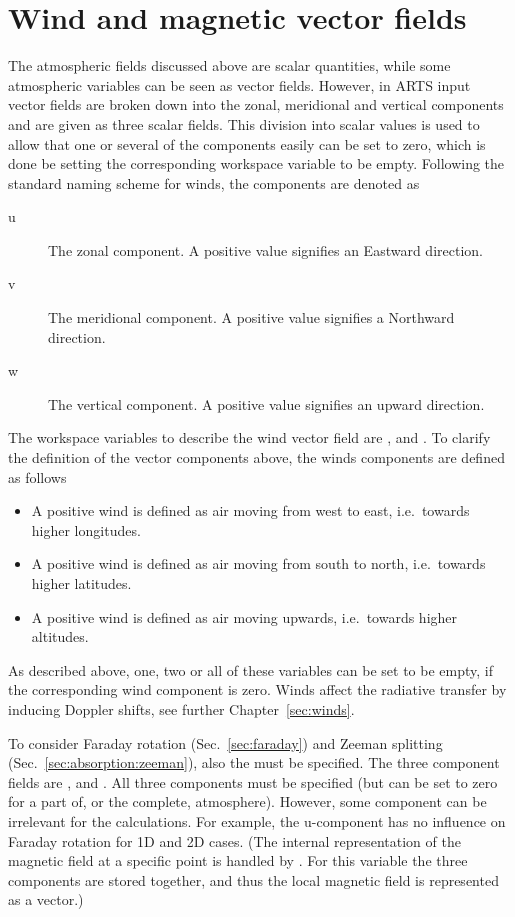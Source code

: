 \section{Wind and magnetic vector fields}
\label{sec:atm:vecfields}
%
The atmospheric fields discussed above are scalar quantities, while some
atmospheric variables can be seen as vector fields. However, in ARTS input
vector fields are broken down into the zonal, meridional and vertical
components and are given as three scalar fields. This division into scalar
values is used to allow that one or several of the components easily can be set
to zero, which is done be setting the corresponding workspace variable to be
empty. Following the standard naming scheme for winds, the components are
denoted as
\begin{description}
\item[u] The zonal component. A positive value signifies an Eastward direction.
\item[v] The meridional component. A positive value signifies a Northward
  direction.
\item[w] The vertical component. A positive value signifies an upward
  direction.
\end{description}
The workspace variables to describe the wind vector field are
,  and
. To clarify the definition of the vector components
above, the winds components are defined as follows
\begin{itemize}
\item[\WindWE] A positive wind is defined as air moving
  from west to east, i.e.\ towards higher longitudes.
\item[\WindSN] A positive wind is defined as air
  moving from south to north, i.e.\ towards higher latitudes.
\item[\WindVe] A positive wind is defined as air
  moving upwards, i.e.\ towards higher altitudes.
\end{itemize}
As described above, one, two or all of these variables can be set to be empty,
if the corresponding wind component is zero. Winds affect the radiative
transfer by inducing Doppler shifts, see further Chapter~\ref{sec:winds}.


To consider Faraday rotation (Sec.~\ref{sec:faraday}) and Zeeman splitting
(Sec.~\ref{sec:absorption:zeeman}), also the  must
be specified. The three component fields are ,
 and . All three components
must be specified (but can be set to zero for a part of, or the complete,
atmosphere). However, some component can be irrelevant for the calculations.
For example, the u-component has no influence on Faraday rotation for 1D and 2D
cases. (The internal representation of the magnetic field at a specific point
is handled by . For this variable the three components are
stored together, and thus the local magnetic field is represented as a vector.)




